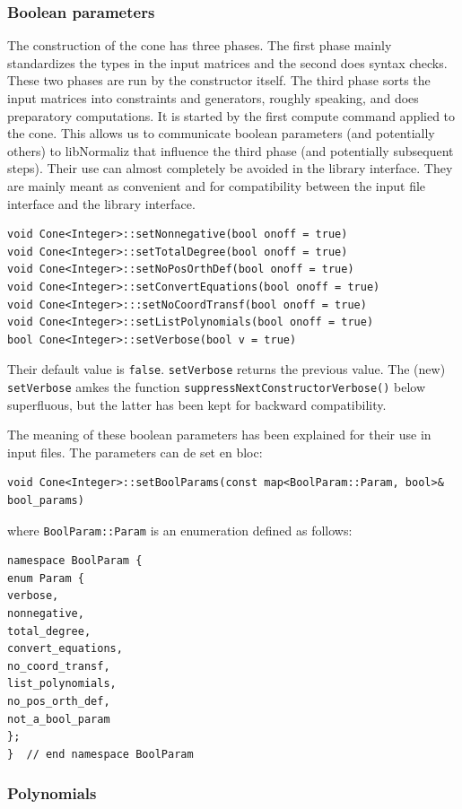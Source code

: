 \begin{small}
\subsubsection{Boolean parameters}\label{bool_param}

The construction of the cone has three phases. The first phase mainly standardizes the types in the input matrices and the second does syntax checks. These two phases are run by the constructor itself. The third phase sorts the input matrices into constraints and generators, roughly speaking, and does preparatory computations. It is started by the first compute command applied to the cone. This allows us to communicate boolean parameters (and potentially others) to libNormaliz that influence the third phase (and potentially subsequent steps). Their use can almost completely be avoided in the library interface. They are mainly meant as convenient and for compatibility between the input file interface and the library interface.
\begin{Verbatim}
void Cone<Integer>::setNonnegative(bool onoff = true)
void Cone<Integer>::setTotalDegree(bool onoff = true)
void Cone<Integer>::setNoPosOrthDef(bool onoff = true)
void Cone<Integer>::setConvertEquations(bool onoff = true)
void Cone<Integer>:::setNoCoordTransf(bool onoff = true)
void Cone<Integer>::setListPolynomials(bool onoff = true)
bool Cone<Integer>::setVerbose(bool v = true)
\end{Verbatim}

Their default value is \verb*|false|. \verb*|setVerbose| returns the previous value. The (new) \verb*|setVerbose| amkes the function \verb*|suppressNextConstructorVerbose()| below superfluous, but the latter has been kept for backward compatibility.

The meaning of these boolean parameters has been explained for their use in input files. The parameters can de set en bloc:
\begin{Verbatim}
void Cone<Integer>::setBoolParams(const map<BoolParam::Param, bool>& bool_params)
\end{Verbatim}
where \verb*|BoolParam::Param| is an enumeration defined as follows:
\begin{Verbatim}
namespace BoolParam {
enum Param {
verbose,
nonnegative,
total_degree,
convert_equations,
no_coord_transf,
list_polynomials,
no_pos_orth_def,
not_a_bool_param
};
}  // end namespace BoolParam
\end{Verbatim}

\subsubsection{Polynomials}\label{poly_param}


\end{small}
